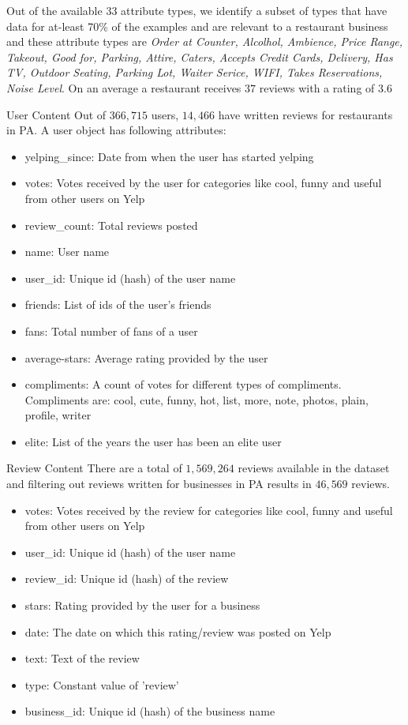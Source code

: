 \documentclass[12pt]{article}
\begin{document}
Out of the available 33 attribute types, we identify a subset of types that have data for at-least 70\% of the examples and are relevant to a restaurant business and these attribute types are  \textit{Order at Counter, Alcolhol, Ambience, Price Range, Takeout, Good for, Parking, Attire, Caters, Accepts Credit Cards, Delivery, Has TV, Outdoor Seating, Parking Lot, Waiter Serice, WIFI, Takes Reservations, Noise Level}. On an average a restaurant receives $37$ reviews with a rating of $3.6$



User Content
Out of $366,715$ users, $14,466$ have written reviews for restaurants in PA. A user object has following attributes:
\begin{itemize}
	\item yelping\_since: Date from when the user has started yelping
	\item votes: Votes received by the user for categories like cool, funny and useful from other users on Yelp
	\item review\_count: Total reviews posted
	\item name: User name
	\item user\_id: Unique id (hash) of the user name
	\item friends: List of ids of the user's friends
	\item fans: Total number of fans of a user
	\item average-stars: Average rating provided by the user
	\item compliments: A count of votes for different types of compliments. Compliments are: cool, cute, funny, hot, list, more, note, photos, plain, profile, writer
	\item elite: List of the years the user has been an elite user
\end{itemize}

Review Content
There are a total of $1,569,264$ reviews available in the dataset and filtering out reviews written for businesses in PA results in $46,569$ reviews.
\begin{itemize}
	\item votes: Votes received by the review for categories like cool, funny and useful from other users on Yelp
	\item user\_id: Unique id (hash) of the user name
	\item review\_id: Unique id (hash) of the review
	\item stars: Rating provided by the user for a business
	\item date: The date on which this rating/review was posted on Yelp
	\item text: Text of the review
	\item type: Constant value of 'review'
	\item business\_id: Unique id (hash) of the business name
\end{itemize}
\end{document}
